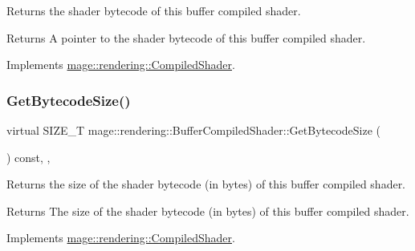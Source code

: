 Returns the shader bytecode of this buffer compiled shader.

\begin{DoxyReturn}{Returns}
A pointer to the shader bytecode of this buffer compiled shader. 
\end{DoxyReturn}


Implements \hyperlink{classmage_1_1rendering_1_1_compiled_shader_a6067250341f428be19ed2aa9955a10b6}{mage\+::rendering\+::\+Compiled\+Shader}.

\hypertarget{classmage_1_1rendering_1_1_buffer_compiled_shader_a235948a6ba0bcac698d6e35ce3504da2}{}\label{classmage_1_1rendering_1_1_buffer_compiled_shader_a235948a6ba0bcac698d6e35ce3504da2} 
\subsubsection{\texorpdfstring{Get\+Bytecode\+Size()}{GetBytecodeSize()}}
{\footnotesize\ttfamily virtual S\+I\+Z\+E\+\_\+T mage\+::rendering\+::\+Buffer\+Compiled\+Shader\+::\+Get\+Bytecode\+Size (\begin{DoxyParamCaption}{ }\end{DoxyParamCaption}) const\hspace{0.3cm}{\ttfamily [override]}, {\ttfamily [virtual]}, {\ttfamily [noexcept]}}

Returns the size of the shader bytecode (in bytes) of this buffer compiled shader.

\begin{DoxyReturn}{Returns}
The size of the shader bytecode (in bytes) of this buffer compiled shader. 
\end{DoxyReturn}


Implements \hyperlink{classmage_1_1rendering_1_1_compiled_shader_a92c17b46242bf884c3d0d673e88a292d}{mage\+::rendering\+::\+Compiled\+Shader}.

\hypertarget{classmage_1_1rendering_1_1_buffer_compiled_shader_a1f8eb13198c5bad8ebe55ae1ddf94769}{}\label{classmage_1_1rendering_1_1_buffer_compiled_shader_a1f8eb13198c5bad8ebe55ae1ddf94769} 
